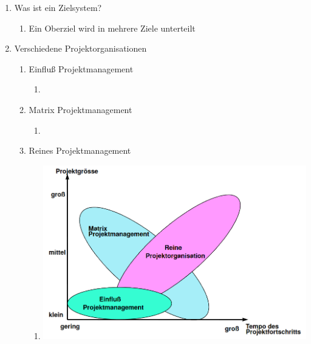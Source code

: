 \documentclass[12pt,a4paper]{article}
\begin{document}
\begin{enumerate}
\begin{enumerate}
	\end{enumerate}
\item Was ist ein Zielsystem?
	\begin{enumerate}
	\item[] Ein Oberziel wird in mehrere Ziele unterteilt
	\end{enumerate}
\item Verschiedene Projektorganisationen
	\begin{enumerate}
	\item[] Einfluß Projektmanagement
		\begin{enumerate}
		\item[]
		\end{enumerate}
	\item[] Matrix Projektmanagement
		\begin{enumerate}
		\item[]
		\end{enumerate}
	\item[] Reines Projektmanagement
		\begin{enumerate}
		\item[] \includegraphics[scale=0.6]{Bilder/projektorganisationenWirksamkeit.PNG}
		\end{enumerate}
	\end{enumerate}
\end{enumerate}
\end{document}
